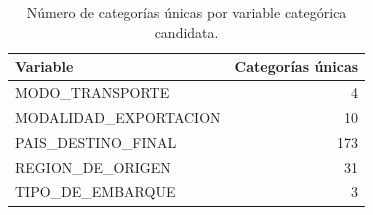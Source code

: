 \begin{table}
\caption{Número de categorías únicas por variable categórica candidata.}
\label{tab:categoricas}
\begin{tabular}{lr}
\toprule
Variable & Categorías únicas \\
\midrule
MODO_TRANSPORTE & 4 \\
MODALIDAD_EXPORTACION & 10 \\
PAIS_DESTINO_FINAL & 173 \\
REGION_DE_ORIGEN & 31 \\
TIPO_DE_EMBARQUE & 3 \\
\bottomrule
\end{tabular}
\end{table}
